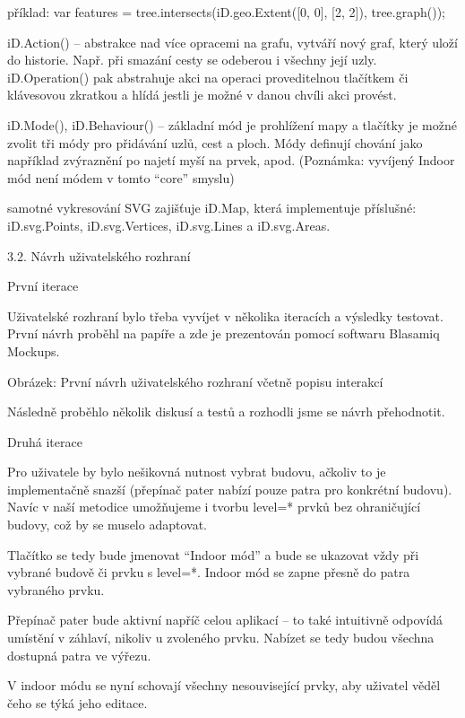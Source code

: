 příklad: var features = tree.intersects(iD.geo.Extent([0, 0], [2, 2]), tree.graph());

iD.Action() – abstrakce nad více opracemi na grafu, vytváří nový graf, který uloží do historie. Např. při smazání cesty se odeberou i všechny její uzly. iD.Operation() pak abstrahuje akci na operaci proveditelnou tlačítkem či klávesovou zkratkou a hlídá jestli je možné v danou chvíli akci provést.

iD.Mode(), iD.Behaviour() – základní mód je prohlížení mapy a tlačítky je možné zvolit tři módy pro přidávání uzlů, cest a ploch. Módy definují chování jako například zvýraznění po najetí myší na prvek, apod. (Poznámka: vyvíjený Indoor mód není módem v tomto “core” smyslu)

samotné vykresování SVG zajišťuje iD.Map, která implementuje příslušné: iD.svg.Points, iD.svg.Vertices, iD.svg.Lines a iD.svg.Areas.

3.2. Návrh uživatelského rozhraní



První iterace



Uživatelské rozhraní bylo třeba vyvíjet v několika iteracích a výsledky testovat. První návrh proběhl na papíře a zde je prezentován pomocí softwaru Blasamiq Mockups.



Obrázek: První návrh uživatelského rozhraní včetně popisu interakcí

Následně proběhlo několik diskusí a testů a rozhodli jsme se návrh přehodnotit.

Druhá iterace



Pro uživatele by bylo nešikovná nutnost vybrat budovu, ačkoliv to je implementačně snazší (přepínač pater nabízí pouze patra pro konkrétní budovu). Navíc v naší metodice umožňujeme i tvorbu level=* prvků bez ohraničující budovy, což by se muselo adaptovat.

Tlačítko se tedy bude jmenovat “Indoor mód” a bude se ukazovat vždy při vybrané budově či prvku s level=*. Indoor mód se zapne přesně do patra vybraného prvku.

Přepínač pater bude aktivní napříč celou aplikací – to také intuitivně odpovídá umístění v záhlaví, nikoliv u zvoleného prvku. Nabízet se tedy budou všechna dostupná patra ve výřezu.

V indoor módu se nyní schovají všechny nesouvisející prvky, aby uživatel věděl čeho se týká jeho editace.

